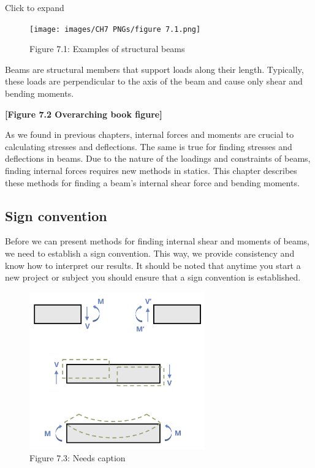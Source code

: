 \documentclass[
  letterpaper,
  DIV=11,
  numbers=noendperiod]{scrreprt}
\begin{document}

Click to expand

\begin{figure}[H]

{\centering \texttt{[image: images/CH7 PNGs/figure 7.1.png]}

}

\caption{Figure 7.1: Examples of structural beams}

\end{figure}%

Beams are structural members that support loads along their length.
Typically, these loads are perpendicular to the axis of the beam and
cause only shear and bending moments.

\textbf{{[}Figure 7.2 Overarching book figure{]}}

As we found in previous chapters, internal forces and moments are
crucial to calculating stresses and deflections. The same is true for
finding stresses and deflections in beams. Due to the nature of the
loadings and constraints of beams, finding internal forces requires new
methods in statics. This chapter describes these methods for finding a
beam's internal shear force and bending moments.

\subsection*{Sign convention}\label{sign-convention}

Before we can present methods for finding internal shear and moments of
beams, we need to establish a sign convention. This way, we provide
consistency and know how to interpret our results. It should be noted
that anytime you start a new project or subject you should ensure that a
sign convention is established.

\begin{figure}[H]

{\centering \includegraphics[width=2.97917in,height=\textheight]{images/CH7 PNGs/figure 7.3.png}

}

\caption{Figure 7.3: Needs caption}

\end{figure}%
\end{document}
